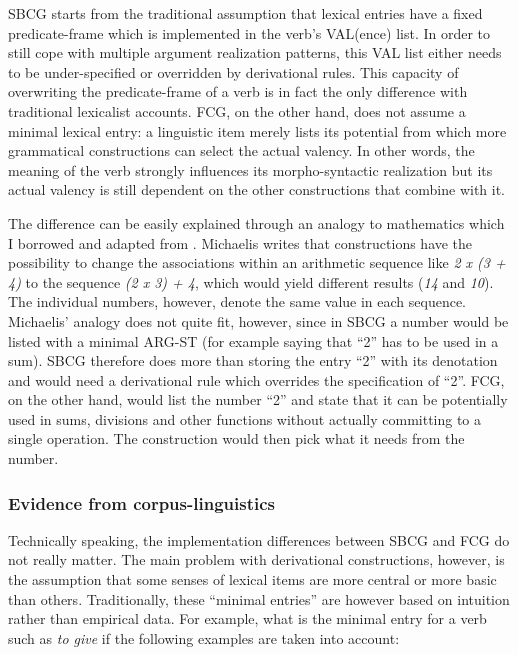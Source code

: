 SBCG starts from the traditional assumption that lexical entries have a fixed predicate-frame which is implemented in the verb's VAL(ence) list. In order to still cope with multiple argument realization patterns, this VAL list either needs to be under-specified or overridden by derivational rules. This capacity of overwriting the predicate-frame of a verb is in fact the only difference with traditional lexicalist accounts. FCG, on the other hand, does not assume a minimal lexical entry: a linguistic item merely lists its potential from which more grammatical constructions can select the actual valency. In other words, the meaning of the verb strongly influences its morpho-syntactic realization but its actual valency is still dependent on the other constructions that combine with it.

The difference can be easily explained through an analogy to mathematics which I borrowed and adapted from \citet{michaelis06complementation}. Michaelis writes that constructions have the possibility to change the associations within an arithmetic sequence like {\em 2 x (3 + 4)} to the sequence {\em (2 x 3) + 4}, which would yield different results ({\em 14} and {\em 10}). The individual numbers, however, denote the same value in each sequence. Michaelis' analogy does not quite fit, however, since in SBCG a number would be listed with a minimal ARG-ST (for example saying that ``2'' has to be used in a sum). SBCG therefore does more than storing the entry ``2'' with its denotation and would need a derivational rule which overrides the specification of ``2''. FCG, on the other hand, would list the number ``2'' and state that it can be potentially used in sums, divisions and other functions without actually committing to a single operation. The construction would then pick what it needs from the number.
 
\subsubsection{Evidence from corpus-linguistics}
Technically speaking, the implementation differences between SBCG and FCG do not really matter. The main problem with derivational constructions, however, is the assumption that some senses of lexical items are more central or more basic than others. Traditionally, these ``minimal entries'' are however based on intuition rather than empirical data. For example, what is the minimal entry for a verb such as {\em to give} if the following examples are taken into account:

